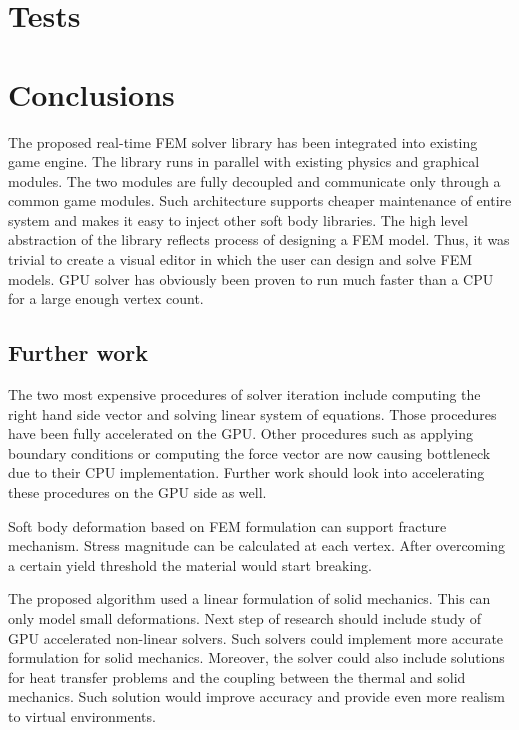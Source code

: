 \documentclass[en]{minipw} %
\begin{document}

\chapter{Tests}
\label{chap:tests}


\chapter{Conclusions}
\label{chap:Conclusions}

The proposed real-time FEM solver library has been integrated into existing game engine. The library runs in parallel with existing physics and graphical modules. The two modules are fully decoupled and communicate only through a common game modules. Such architecture supports cheaper maintenance of entire system and makes it easy to inject other  soft body libraries.
The high level abstraction of the library reflects process of designing a FEM model. Thus, it was trivial to create a visual editor in which the user can design and solve FEM models.
GPU solver has obviously been proven to run much faster than a CPU for a large enough vertex count.

\section{Further work}

The two most expensive procedures of solver iteration include computing the right hand side vector and solving linear system of equations. Those procedures have been fully accelerated on the GPU. Other procedures such as applying boundary conditions or computing the force vector are now causing bottleneck due to their CPU implementation. Further work should look into accelerating these procedures on the GPU side as well.

Soft body deformation based on FEM formulation can support fracture mechanism. Stress magnitude can be calculated at each vertex. After overcoming a certain yield threshold the material would start breaking.

The proposed algorithm used a linear formulation of solid mechanics. This can only model small deformations. Next step of research should include study of GPU accelerated non-linear solvers. Such solvers could implement more accurate formulation for solid mechanics. Moreover, the solver could also include solutions for heat transfer problems and the coupling between the thermal and solid mechanics. Such solution would improve accuracy and provide even more realism to virtual environments.
\end{document}
